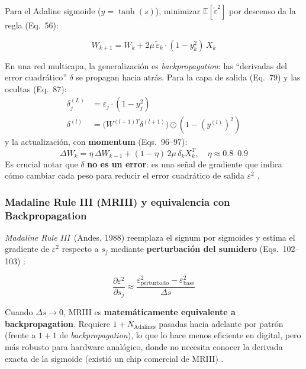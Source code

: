 \documentclass[11pt,a4paper]{article}
\newcommand{\E}{\mathbb{E}}
\newcommand{\bp}{\textit{backpropagation}}
\newcommand{\mriii}{\textit{Madaline Rule III}}
\begin{document}
Para el Adaline sigmoide ($y = \tanh(s)$), minimizar $\E[\tilde\varepsilon^2]$ por descenso da la
regla (Eq.~56):

\begin{equation}
W_{k+1} = W_k + 2\mu\,\tilde{\varepsilon}_k \cdot (1 - y_k^2)\,X_k
\label{eq:backprop_single}
\end{equation}

En una red multicapa, la generalización es \bp: las ``derivadas del error cuadrático'' $\delta$ se
propagan hacia atrás. Para la capa de salida (Eq.~79) y las ocultas (Eq.~87):
\begin{align}
\delta^{(L)}_j &= \varepsilon_j \cdot (1 - y_j^2) \label{eq:delta_out}\\
\delta^{(l)} &= \bigl(W^{(l+1)T} \delta^{(l+1)}\bigr) \odot (1 - (y^{(l)})^2) \label{eq:delta_hid}
\end{align}
y la actualización, con \textbf{momentum} (Eqs.~96--97):
\begin{equation}
\Delta W_k = \eta\,\Delta W_{k-1} + (1-\eta)\,2\mu\,\delta_k X_k^T,\quad \eta \approx 0.8\text{--}0.9
\label{eq:momentum}
\end{equation}
Es crucial notar que $\delta$ \textbf{no es un error}: es una señal de gradiente que indica cómo
cambiar cada peso para reducir el error cuadrático de salida $\varepsilon^2$
\cite{widrow1990,rumelhart1986}.

\subsubsection{Madaline Rule III (MRIII) y equivalencia con Backpropagation}

\mriii~(Andes, 1988) reemplaza el signum por sigmoides y estima el gradiente de $\varepsilon^2$
respecto a $s_j$ mediante \textbf{perturbación del sumidero} (Eqs.~102--103) \cite{widrow1990}:

\begin{equation}
\frac{\partial \varepsilon^2}{\partial s_j} \approx
\frac{\varepsilon^2_{\text{perturbado}} - \varepsilon^2_{\text{base}}}{\Delta s}
\label{eq:mriii}
\end{equation}

Cuando $\Delta s \to 0$, MRIII es \textbf{matemáticamente equivalente a backpropagation}. Requiere
$1 + N_{\text{Adalines}}$ pasadas hacia adelante por patrón (frente a $1+1$ de \bp), lo que lo hace
menos eficiente en digital, pero más robusto para hardware analógico, donde no necesita conocer la
derivada exacta de la sigmoide (existió un chip comercial de MRIII) \cite{widrow1990}.
\end{document}
